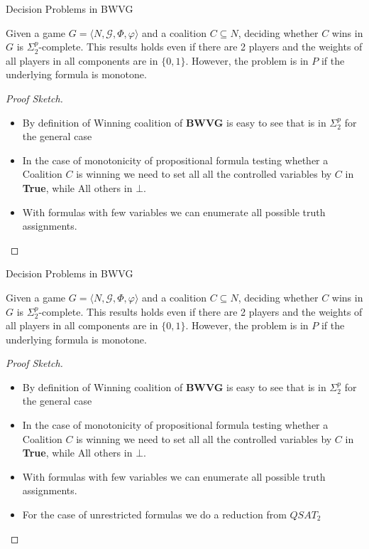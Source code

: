 \documentclass{beamer}
\begin{document}
\begin{frame}[fragile]{Decision Problems in BWVG}
  \begin{theorem3}
    Given a game $G = \langle N, \mathcal{G}, \Phi, \varphi \rangle$ and a coalition $C \subseteq N$, 
    deciding whether $C$ wins in $G$ is $\Sigma_2^p$-complete. This results holds even if there are 2 players
    and the weights of all players in all components are in $\{0,1\}$. However, the problem is in $P$ if the underlying
    formula is monotone.
  \end{theorem3}
  \begin{proof}[Proof Sketch]
    \begin{itemize}
      \item By definition of Winning coalition of \textbf{BWVG} is easy to see that is in $\Sigma_2^p$ for the general case
      \item In the case of monotonicity of propositional formula testing whether a Coalition $C$ is winning we need to set all 
      all the controlled variables by $C$ in \textbf{True}, while All others in \textbf{$\bot$}.
      \item With formulas with few variables we can enumerate all possible truth assignments.
    \end{itemize}
  \end{proof}
\end{frame}


\begin{frame}[fragile]{Decision Problems in BWVG}
  \begin{theorem3}
    Given a game $G = \langle N, \mathcal{G}, \Phi, \varphi \rangle$ and a coalition $C \subseteq N$, 
    deciding whether $C$ wins in $G$ is $\Sigma_2^p$-complete. This results holds even if there are 2 players
    and the weights of all players in all components are in $\{0,1\}$. However, the problem is in $P$ if the underlying
    formula is monotone.
  \end{theorem3}
  \begin{proof}[Proof Sketch]
    \begin{itemize}
      \item By definition of Winning coalition of \textbf{BWVG} is easy to see that is in $\Sigma_2^p$ for the general case
      \item In the case of monotonicity of propositional formula testing whether a Coalition $C$ is winning we need to set all 
      all the controlled variables by $C$ in \textbf{True}, while All others in \textbf{$\bot$}.
      \item With formulas with few variables we can enumerate all possible truth assignments.
      \item For the case of unrestricted formulas we do a reduction from $QSAT_2$
    \end{itemize}
  \end{proof}
\end{frame}
\end{document}
